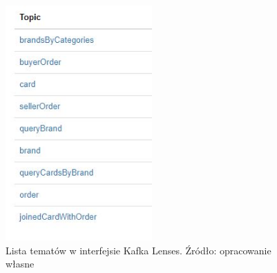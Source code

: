 \begin{figure}[h!]
  \centering
    \includegraphics[width=0.5\textwidth]{images/tematy.JPG}
  \caption{Lista tematów w interfejsie Kafka Lenses. Źródło: opracowanie własne }
\end{figure}
\FloatBarrier